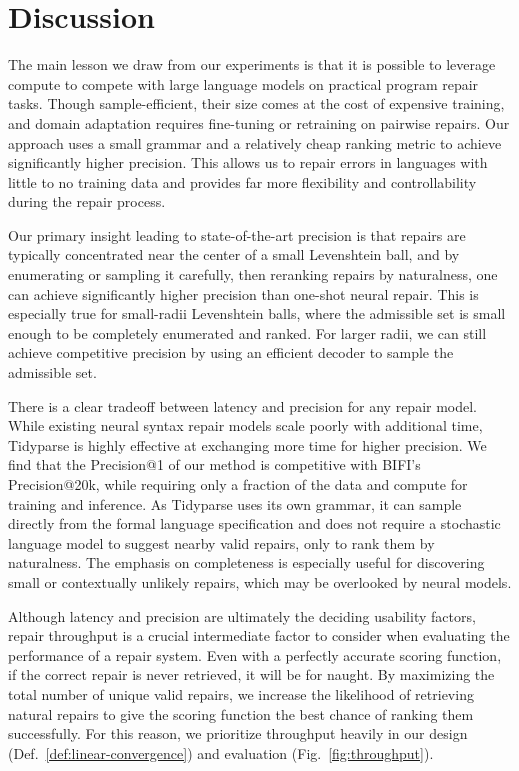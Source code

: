 \documentclass[sigplan,acmsmall,nonacm,screen]{acmart}\settopmatter{printfolios=false,printccs=false,printacmref=false}
\begin{document}
  \section{Discussion}\label{sec:discussion}

  The main lesson we draw from our experiments is that it is possible to leverage compute to compete with large language models on practical program repair tasks. Though sample-efficient, their size comes at the cost of expensive training, and domain adaptation requires fine-tuning or retraining on pairwise repairs. Our approach uses a small grammar and a relatively cheap ranking metric to achieve significantly higher precision. This allows us to repair errors in languages with little to no training data and provides far more flexibility and controllability during the repair process.

  Our primary insight leading to state-of-the-art precision is that repairs are typically concentrated near the center of a small Levenshtein ball, and by enumerating or sampling it carefully, then reranking repairs by naturalness, one can achieve significantly higher precision than one-shot neural repair. This is especially true for small-radii Levenshtein balls, where the admissible set is small enough to be completely enumerated and ranked. For larger radii, we can still achieve competitive precision by using an efficient decoder to sample the admissible set.

  There is a clear tradeoff between latency and precision for any repair model. While existing neural syntax repair models scale poorly with additional time, Tidyparse is highly effective at exchanging more time for higher precision. We find that the Precision@1 of our method is competitive with BIFI's Precision@20k, while requiring only a fraction of the data and compute for training and inference. As Tidyparse uses its own grammar, it can sample directly from the formal language specification and does not require a stochastic language model to suggest nearby valid repairs, only to rank them by naturalness. The emphasis on completeness is especially useful for discovering small or contextually unlikely repairs, which may be overlooked by neural models.

   Although latency and precision are ultimately the deciding usability factors, repair throughput is a crucial intermediate factor to consider when evaluating the performance of a repair system. Even with a perfectly accurate scoring function, if the correct repair is never retrieved, it will be for naught. By maximizing the total number of unique valid repairs, we increase the likelihood of retrieving natural repairs to give the scoring function the best chance of ranking them successfully. For this reason, we prioritize throughput heavily in our design (Def.~\ref{def:linear-convergence}) and evaluation (Fig.~\ref{fig:throughput}).
\end{document}
